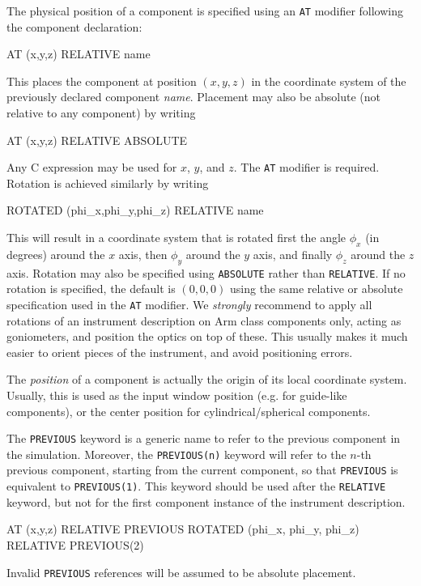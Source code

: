 The physical position of a component is specified using an \texttt{AT} modifier
following the component declaration:
\begin{mcstas}
  AT (x,y,z) RELATIVE name
\end{mcstas}
This places the component at position $(x,y,z)$ in the coordinate system
of the previously declared component \textit{name}. Placement may also
be absolute (not relative to any component) by writing
\begin{mcstas}
  AT (x,y,z) RELATIVE ABSOLUTE
\end{mcstas}
Any C expression may be used for $x$, $y$, and $z$. The \texttt{AT}
modifier is required.
Rotation is achieved similarly by writing
\begin{mcstas}
  ROTATED (phi_x,phi_y,phi_z) RELATIVE name
\end{mcstas}
This will result in a coordinate system that is rotated first the angle $\phi_x$
(in degrees) around the $x$ axis, then $\phi_y$ around the $y$ axis, and finally
$\phi_z$ around the $z$ axis. Rotation may also be specified using
\texttt{ABSOLUTE} rather than \texttt{RELATIVE}. If no rotation is specified,
the default is $(0,0,0)$ using the same relative or absolute specification used
in the \texttt{AT} modifier. We \emph{strongly} recommend to apply all rotations
of an instrument description on Arm class components only, acting as
goniometers, and position the optics on top of these. This usually makes it much
easier to orient pieces of the instrument, and avoid positioning errors.

The \emph{position} of
a component is actually the origin of its local coordinate
system. Usually, this is used as the input window position (e.g. for
guide-like components), or the center position for
cylindrical/spherical components.

The \texttt{PREVIOUS}
keyword is a generic name to
refer to the previous component in the simulation. Moreover, the
\texttt{PREVIOUS(n)} keyword will refer to the $n$-th previous component,
starting from the current component, so that \texttt{PREVIOUS} is equivalent to
\texttt{PREVIOUS(1)}. This keyword should be used after the \texttt{RELATIVE}
keyword, but not for the first component instance of the instrument description.
\begin{mcstas}
AT (x,y,z) RELATIVE PREVIOUS
ROTATED (phi_x, phi_y, phi_z) RELATIVE PREVIOUS(2)
\end{mcstas}
Invalid \texttt{PREVIOUS} references will be assumed to be absolute placement.

